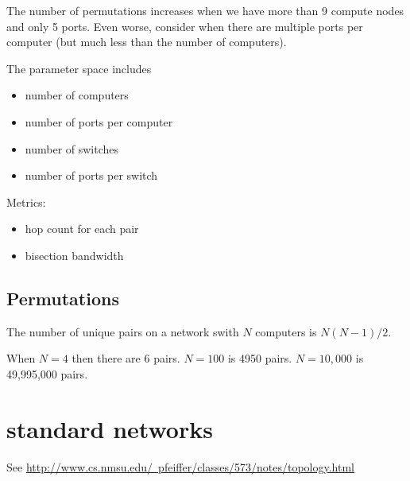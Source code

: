 \documentclass[pdftex]{article}
\begin{document}
The number of permutations increases when we have more than 9 compute nodes and only 5 ports. Even worse, consider when there are multiple ports per computer (but much less than the number of computers).

The parameter space includes
\begin{itemize}
 \item number of computers
 \item number of ports per computer
 \item number of switches
 \item number of ports per switch
\end{itemize}
Metrics:
\begin{itemize}
 \item hop count for each pair
 \item bisection bandwidth
\end{itemize}


\subsection{Permutations}

The number of unique pairs on a network swith $N$ computers is $N(N-1)/2$. 

When $N=4$ then there are 6 pairs. $N=100$ is 4950 pairs. $N=10,000$ is 49,995,000 pairs.

\section{standard networks}

See \href{http://www.cs.nmsu.edu/~pfeiffer/classes/573/notes/topology.html}{http://www.cs.nmsu.edu/~pfeiffer/classes/573/notes/topology.html}
\end{document}
